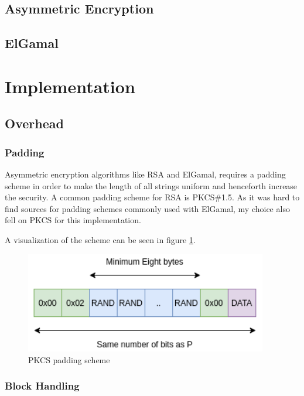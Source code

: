 \documentclass{article}
\begin{document}
\subsection{Asymmetric Encryption}

\subsection{ElGamal}


\section{Implementation}


\subsection{Overhead}

\subsubsection{Padding}
Asymmetric encryption algorithms like RSA and ElGamal, requires a padding scheme in order to make the length of all strings uniform and henceforth increase the security. A common padding scheme for RSA is PKCS\#1.5. As it was hard to find sources for padding schemes commonly used with ElGamal, my choice also fell on PKCS for this implementation. 

A visualization of the scheme can be seen in figure \ref{rPKCS}.  


\begin{figure}[H]
 \centering
  \includegraphics[width=300pt]{img/padding.png}
 \caption{PKCS padding scheme}
 \label{rPKCS}
 \end{figure}

\subsubsection{Block Handling}
\end{document}
